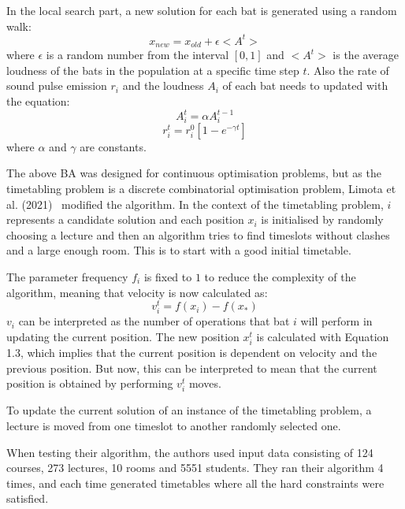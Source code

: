 In the local search part, a new solution for each bat is generated using a
random walk:
\begin{equation*}
	x_{new} = x_{old} + \epsilon < A^t >
\end{equation*}
where \( \epsilon \) is a random number from the interval \( [0,1] \) and
\( < A^t > \) is the average loudness of the bats in the population at a
specific time step \( t \).
Also the rate of sound pulse emission \( r_i \) and the loudness \( A_i \) of 
each bat needs to updated with the equation:
\begin{equation*}
	A_i^t = \alpha A_i^{t-1}
\end{equation*}
\begin{equation*}
	r_i^t = r_i^0 [1 - e^{-\gamma t}]
\end{equation*}
where \( \alpha \) and \( \gamma \) are constants.

The above BA was designed for continuous optimisation problems, but as the
timetabling problem is a discrete combinatorial optimisation problem, Limota et
al. (2021)~\cite{ba_example} modified the algorithm.
In the context of the timetabling problem, \( i \) represents a candidate 
solution and each position \( x_i \) is initialised by randomly choosing a
lecture and then an algorithm tries to find timeslots without clashes and a 
large enough room. This is to start with a good initial timetable.

The parameter frequency \( f_i \) is fixed to \( 1 \) to reduce the complexity 
of the algorithm, meaning that velocity is now calculated as:
\begin{equation*}
	v_i^t = f(x_i) - f(x_*)
\end{equation*}
\( v_i \) can be interpreted as the number of operations that bat \( i \) will 
perform in updating the current position. The new position \( x_i^t \) is
calculated with Equation 1.3, which implies that the current position is
dependent on velocity and the previous position. But now, this can be 
interpreted to mean that the current position is obtained by performing 
\( v_i^t \) moves.

To update the current solution of an instance of the timetabling problem, a
lecture is moved from one timeslot to another randomly selected one.

When testing their algorithm, the authors used input data consisting of 
124 courses, 273 lectures, 10 rooms and 5551 students. They ran their algorithm 
4 times, and each time generated timetables where all the hard constraints were
satisfied.

